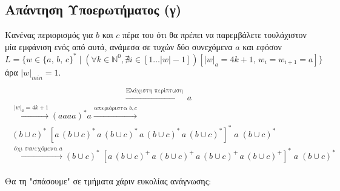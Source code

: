 \subsection{Απάντηση Υποερωτήματος (γ)}
\label{ssec:Solution_1.3}
\doublespacing
Κανένας περιορισμός για $b$ και $c$ πέρα του ότι θα πρέπει να παρεμβάλετε τουλάχιστον μία εμφάνιση ενός
από αυτά, ανάμεσα σε τυχών δύο συνεχόμενα $a$ και εφόσον\\
$L\! =\! \{w \in \{a,\, b,\, c\}^* \mid (\forall k \in \mathbb{N}^0, \nexists i \in [1\dots \vert w\vert-1])
[\vert w\vert_a = 4k+1,\, w_i = w_{i+1} = a]\}$ άρα $\vert w\vert_{min} = 1$.


\begin{equation*}
		\overset{\text{Ελάχιστη περίπτωση }}{\rightarrow} a
\end{equation*}
\begin{equation*}
	\begin{split}
		\begin{gathered}
	\overset{\vert w \vert_a = 4k+1}{\rightarrow}
	 (aaaa)^* a
	\overset{\text{απεριόριστα }b, c}{\rightarrow}\\
	(b \cup c)^* \; [ a\, (b \cup c)^*\, a\, (b \cup c)^*\, a \,(b \cup c)^*\, a\, (b \cup c)^*]^*\; a\; (b \cup
	c)^* \\
	\overset{\text{όχι συνεχόμενα }a}{\rightarrow}
	(b \cup c)^* \; [a\, (b \cup c)^+\, a\, (b \cup c)^+\, a \,(b \cup c)^+\, a\, (b \cup c)^+]^*\; a \;(b \cup c)^*
		\end{gathered}
	\end{split}
\end{equation*}

\par
Θα τη "σπάσουμε" σε τμήματα χάριν ευκολίας ανάγνωσης:
\reducevspace\reducevspace\reducevspace
\reducevspace\reducevspace\reducevspace
\begin{comment}
	\phantom{\text{Τελική κανονική έκφραση χωρισμένη βάση μοτίβου}}
	\begin{equation*}
		{\boldmath
			\begin{split}
				\begin{gathered}
					(b^*c^*)^*\textcolor{orange}{[}
					\\(a\textcolor{purple}{[}b(b^*c^*)^* \cup c(b^*c^*)^*\textcolor{purple}{]})
					\\(a\textcolor{purple}{[}b(b^*c^*)^* \cup c(b^*c^*)^*\textcolor{purple}{]})
					\\(a\textcolor{purple}{[}b(b^*c^*)^* \cup c(b^*c^*)^*\textcolor{purple}{]})
					\\(a\textcolor{purple}{[}b(b^*c^*)^* \cup c(b^*c^*)^*\textcolor{purple}{]})
					\\ \textcolor{orange}{]}^* a(b^*c^*)^*
				\end{gathered}
		\end{split}}
		\;\;\;\;\;\;\;\;\;\;\text{Τελική κανονική έκφραση χωρισμένη βάση μοτίβου}
	\end{equation*}
\end{comment}

